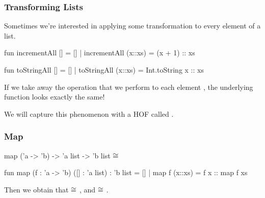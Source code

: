 \documentclass[aspectratio=169, handout]{beamer}
\begin{document}
\begin{frame}[fragile]
  \frametitle{Transforming Lists}

  Sometimes we're interested in applying some transformation to every element of a list.

  \pause
  \vspace{\fill}

  \begin{codeblock}
    fun incrementAll [] = []
      | incrementAll (x::xs) = (x + 1) :: xs

    fun toStringAll [] = [] 
      | toStringAll (x::xs) = Int.toString x :: xs 
  \end{codeblock}

  \vspace{\fill}
  \pause

  If we take away the operation that we perform to each element , the underlying
  function looks exactly the same! 

  \pause
  \vspace{\fill}

  We will capture this phenomenon with a HOF called .
\end{frame}

\begin{frame}[fragile]
  \frametitle{Map}

  \spec
    {map}
    {('a -> 'b) -> 'a list -> 'b list}
    {}
    { $\cong$ \code{[f x1, ..., f xn]}}

  \pause
  \vspace{\fill}

  \begin{codeblock}
    fun map (f : 'a -> 'b) ([] : 'a list) : 'b list = []
      | map f (x::xs) = f x :: map f xs
  \end{codeblock}

  \pause
  \vspace{\fill}

  Then we obtain that  $\cong$ , 
  and  $\cong$ .
\end{frame}
\end{document}
